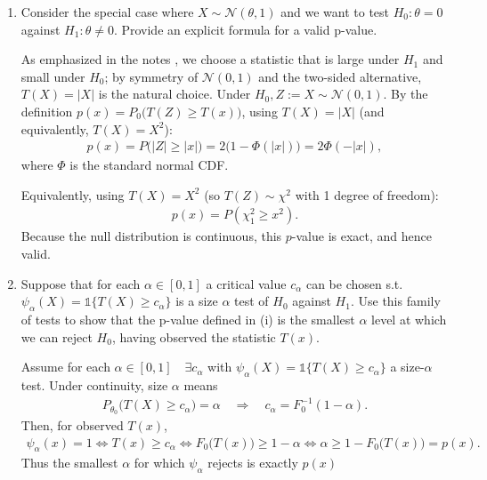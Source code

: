 \documentclass[10pt]{article}
\begin{document}
\begin{enumerate}[label=(\roman*)]
    \item Consider the special case where $X \sim \mathcal{N}(\theta, 1)$ and we want to test $H_0: \theta = 0 $ against $H_1 : \theta \neq 0 $. Provide an explicit formula for a valid p-value.
    
    As emphasized in the notes \cite[p.~81]{notes}, we choose a statistic that is large under $H_1$ and small under $H_0$; by symmetry of $\mathcal{N}(0, 1)$ and the two-sided alternative, $T(X) = |X| $ is the natural choice. Under $H_0, Z := X \sim \mathcal{N}(0, 1)$. By the definition $p(x) = P_0\big(T(Z) \ge T(x)\big)$, using $T(X) = |X|$ (and equivalently, $T(X) = X^2 $):
    \begin{gather*}
        p(x) = P\big(|Z| \ge |x|) = 2(1 - \Phi(|x|)\big) = 2\Phi(-|x|),
    \end{gather*}
    where $\Phi $ is the standard normal CDF.

    Equivalently, using $T(X) = X^2 $ (so $T(Z) \sim \chi^2 $ with 1 degree of freedom): 
    \begin{gather*}
        p(x) = P(\chi^2_1 \ge x^2).
    \end{gather*}
    Because the null distribution is continuous, this $p$-value is exact, and hence valid.

    \item Suppose that for each $\alpha \in [0, 1]$ a critical value $c_\alpha $ can be chosen s.t. $\psi_\alpha(X) = \mathds{1}\{T(X) \ge c_\alpha\}$ is a size $\alpha $ test of $H_0 $ against $H_1 $. Use this family of tests to show that the p-value defined in (i) is the smallest $\alpha $ level at which we can reject $H_0 $, having observed the statistic $T(x)$.
    
    Assume for each $\alpha \in [0, 1] \quad\exists c_\alpha $ with $\psi_\alpha(X) = \mathds{1}\{T(X) \ge c_\alpha\}$ a size-$\alpha $ test. Under continuity, size $\alpha $ means
    \begin{gather*}
        P_{\theta_0}\big(T(X) \ge c_\alpha\big) = \alpha \quad\Rightarrow\quad c_\alpha = F_0^{-1}(1 - \alpha).
    \end{gather*}
    Then, for observed $T(x)$,
    \begin{gather*}
        \psi_\alpha(x) = 1 \iff T(x) \ge c_\alpha \iff F_0\big(T(x)\big) \ge 1 - \alpha \iff \alpha \ge 1 - F_0\big(T(x)\big) = p(x).
    \end{gather*}
    Thus the smallest $\alpha $ for which $\psi_\alpha $ rejects is exactly $p(x)$
\end{enumerate}
\end{document}

